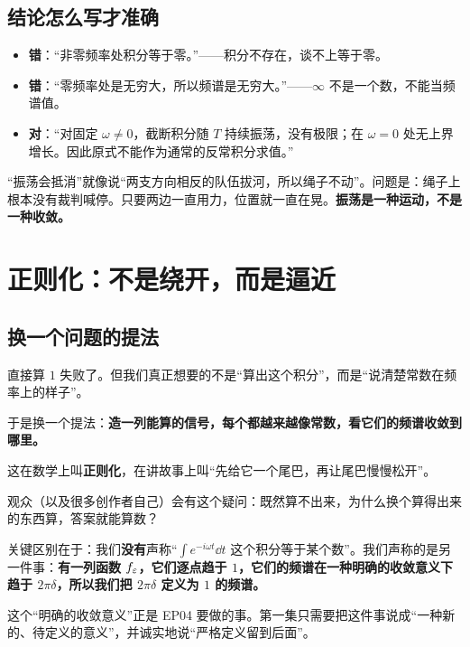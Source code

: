 \subsection{结论怎么写才准确}

\begin{warnbox}
\begin{itemize}[leftmargin=1.4em,itemsep=0.3em]
\item \textbf{错}：“非零频率处积分等于零。”——积分不存在，谈不上等于零。
\item \textbf{错}：“零频率处是无穷大，所以频谱是无穷大。”——$\infty$ 不是一个数，不能当频谱值。
\item \textbf{对}：“对固定 $\omega\neq0$，截断积分随 $T$ 持续振荡，没有极限；在 $\omega=0$ 处无上界增长。因此原式不能作为通常的反常积分求值。”
\end{itemize}
\end{warnbox}

\begin{notebox}[一句可以放在旁白里的比喻]
“振荡会抵消”就像说“两支方向相反的队伍拔河，所以绳子不动”。问题是：绳子上根本没有裁判喊停。只要两边一直用力，位置就一直在晃。\textbf{振荡是一种运动，不是一种收敛。}
\end{notebox}

\section{正则化：不是绕开，而是逼近}

\subsection{换一个问题的提法}

直接算 $1$ 失败了。但我们真正想要的不是“算出这个积分”，而是“说清楚常数在频率上的样子”。

于是换一个提法：\textbf{造一列能算的信号，每个都越来越像常数，看它们的频谱收敛到哪里。}

这在数学上叫\textbf{正则化}，在讲故事上叫“先给它一个尾巴，再让尾巴慢慢松开”。

\begin{ideabox}[为什么这不是耍赖]
观众（以及很多创作者自己）会有这个疑问：既然算不出来，为什么换个算得出来的东西算，答案就能算数？

关键区别在于：我们\textbf{没有}声称“$\int e^{-i\omega t}\dd t$ 这个积分等于某个数”。我们声称的是另一件事：\textbf{有一列函数 $f_\varepsilon$，它们逐点趋于 $1$，它们的频谱在一种明确的收敛意义下趋于 $2\pi\delta$，所以我们把 $2\pi\delta$ 定义为 $1$ 的频谱。}

这个“明确的收敛意义”正是 EP04 要做的事。第一集只需要把这件事说成“一种新的、待定义的意义”，并诚实地说“严格定义留到后面”。
\end{ideabox}

